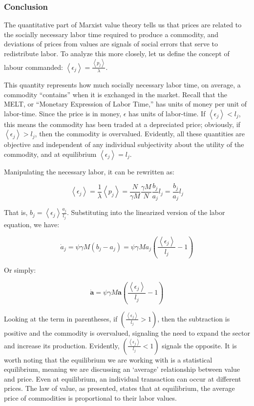 \subsubsection{Conclusion}


The quantitative part of Marxist value theory tells us that prices are related to the socially necessary labor time required to produce a commodity, and deviations of prices from values are signals of social errors that serve to redistribute labor. To analyze this more closely, let us define the concept of labour commanded: $\left\langle \epsilon_{j}\right\rangle=\frac{\left\langle p_{j}\right\rangle }{\lambda}$.

This quantity represents how much socially necessary labor time, on average, a commodity “contains” when it is exchanged in the market. Recall that the MELT, or “Monetary Expression of Labor Time,” has units of money per unit of labor-time. Since the price is in money, $\epsilon$ has units of labor-time. If $\left\langle \epsilon_{j}\right\rangle < l_j$, this means the commodity has been traded at a depreciated price; obviously, if $\left\langle \epsilon_{j}\right\rangle > l_j$, then the commodity is overvalued. Evidently, all these quantities are objective and independent of any individual subjectivity about the utility of the commodity, and at equilibrium $\left\langle \epsilon_{j}\right\rangle = l_j$.  

Manipulating the necessary labor, it can be rewritten as:


$$\left\langle \epsilon_{j}\right\rangle =\frac{1}{\lambda}\left\langle p_{j}\right\rangle =\frac{N}{\gamma M}\frac{\gamma M}{N}\frac{b_{j}}{a_{j}}l_{j}=\frac{b_{j}}{a_{j}}l_{j}
$$

That is, $b_j=\left\langle \epsilon_{j}\right\rangle \frac{a_{j}}{l_{j}}$. Substituting into the linearized version of the labor equation, we have:


$$\dot{a}_{j}=\psi\gamma M\left(b_{j}-a_{j}\right)=\psi\gamma Ma_{j}\left(\frac{\left\langle \epsilon_{j}\right\rangle }{l_{j}}-1\right)$$

Or simply:


$$\dot{\boldsymbol{a}}=\psi\gamma M\boldsymbol{a}\left(\frac{\left\langle \epsilon_{j}\right\rangle }{l_{j}}-1\right)$$

Looking at the term in parentheses, if $\left(\frac{\left\langle \epsilon_{j}\right\rangle }{l_{j}}>1\right)$, then the subtraction is positive and the commodity is overvalued, signaling the need to expand the sector and increase its production. Evidently, $\left(\frac{\left\langle \epsilon_{j}\right\rangle }{l_{j}}< 1\right)$ signals the opposite. It is worth noting that the equilibrium we are working with is a statistical equilibrium, meaning we are discussing an ‘average’ relationship between value and price. Even at equilibrium, an individual transaction can occur at different prices. The law of value, as presented, states that at equilibrium, the average price of commodities is proportional to their labor values.

